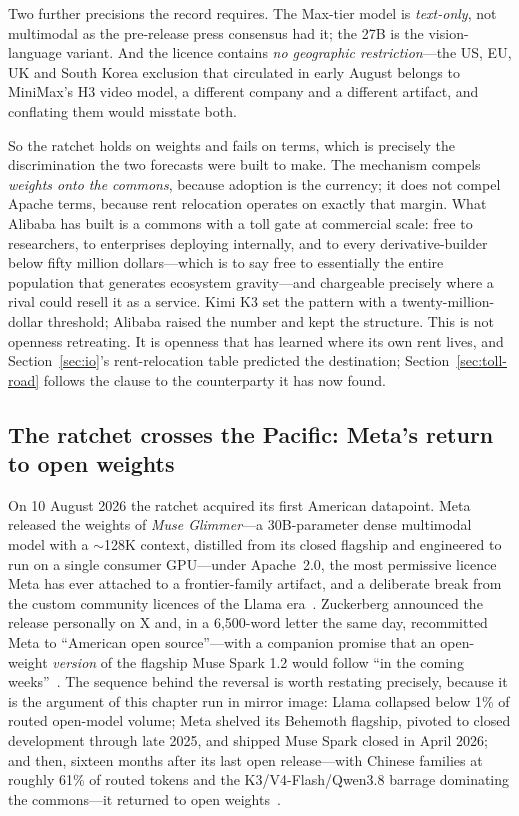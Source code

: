 Two further precisions the record requires. The Max-tier model is \emph{text-only}, not multimodal as the pre-release press consensus had it; the 27B is the vision-language variant. And the licence contains \emph{no geographic restriction}---the US, EU, UK and South Korea exclusion that circulated in early August belongs to MiniMax's H3 video model, a different company and a different artifact, and conflating them would misstate both.

So the ratchet holds on weights and fails on terms, which is precisely the discrimination the two forecasts were built to make. The mechanism compels \emph{weights onto the commons}, because adoption is the currency; it does not compel Apache terms, because rent relocation operates on exactly that margin. What Alibaba has built is a commons with a toll gate at commercial scale: free to researchers, to enterprises deploying internally, and to every derivative-builder below fifty million dollars---which is to say free to essentially the entire population that generates ecosystem gravity---and chargeable precisely where a rival could resell it as a service. Kimi K3 set the pattern with a twenty-million-dollar threshold; Alibaba raised the number and kept the structure. This is not openness retreating. It is openness that has learned where its own rent lives, and Section~\ref{sec:io}'s rent-relocation table predicted the destination; Section~\ref{sec:toll-road} follows the clause to the counterparty it has now found.

\subsection{The ratchet crosses the Pacific: Meta's return to open weights}
\label{sec:muse}

On 10 August 2026 the ratchet acquired its first American datapoint. Meta released the weights of \emph{Muse Glimmer}---a 30B-parameter dense multimodal model with a $\sim$128K context, distilled from its closed flagship and engineered to run on a single consumer GPU---under Apache~2.0, the most permissive licence Meta has ever attached to a frontier-family artifact, and a deliberate break from the custom community licences of the Llama era~\cite{muse-glimmer,muse-aa}. Zuckerberg announced the release personally on X and, in a 6{,}500-word letter the same day, recommitted Meta to ``American open source''---with a companion promise that an open-weight \emph{version} of the flagship Muse Spark 1.2 would follow ``in the coming weeks''~\cite{zuck-letter}. The sequence behind the reversal is worth restating precisely, because it is the argument of this chapter run in mirror image: Llama collapsed below 1\% of routed open-model volume; Meta shelved its Behemoth flagship, pivoted to closed development through late 2025, and shipped Muse Spark closed in April 2026; and then, sixteen months after its last open release---with Chinese families at roughly 61\% of routed tokens and the K3/V4-Flash/Qwen3.8 barrage dominating the commons---it returned to open weights~\cite{muse-glimmer,openrouter-2026}.

